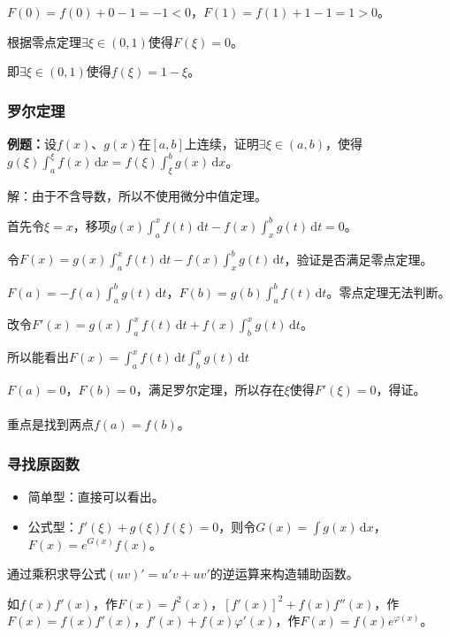 $F(0)=f(0)+0-1=-1<0$，$F(1)=f(1)+1-1=1>0$。

根据零点定理$\exists\xi\in(0,1)$使得$F(\xi)=0$。

即$\exists\xi\in(0,1)$使得$f(\xi)=1-\xi$。

\subsubsection{罗尔定理}

\textbf{例题：}设$f(x)$、$g(x)$在$[a,b]$上连续，证明$\exists\xi\in(a,b)$，使得$g(\xi)\int_a^\xi f(x)\,\textrm{d}x=f(\xi)\int_\xi^bg(x)\,\textrm{d}x$。

解：由于不含导数，所以不使用微分中值定理。

首先令$\xi=x$，移项$g(x)\int_a^xf(t)\,\textrm{d}t-f(x)\int_x^bg(t)\,\textrm{d}t=0$。

令$F(x)=g(x)\int_a^xf(t)\,\textrm{d}t-f(x)\int_x^bg(t)\,\textrm{d}t$，验证是否满足零点定理。

$F(a)=-f(a)\int_a^bg(t)\,\textrm{d}t$，$F(b)=g(b)\int_a^bf(t)\,\textrm{d}t$。零点定理无法判断。

改令$F'(x)=g(x)\int_a^xf(t)\,\textrm{d}t+f(x)\int_b^xg(t)\,\textrm{d}t$。

所以能看出$F(x)=\int_a^xf(t)\,\textrm{d}t\int_b^xg(t)\,\textrm{d}t$

$F(a)=0$，$F(b)=0$，满足罗尔定理，所以存在$\xi$使得$F'(\xi)=0$，得证。

\paragraph{}

重点是找到两点$f(a)=f(b)$。

\subsubsection{寻找原函数}


\begin{itemize}
    \item 简单型：直接可以看出。
    \item 公式型：$f'(\xi)+g(\xi)f(\xi)=0$，则令$G(x)=\int g(x)\,\textrm{d}x$，$F(x)=e^{G(x)}f(x)$。
\end{itemize}

通过乘积求导公式$(uv)'=u'v+uv'$的逆运算来构造辅助函数。

如$f(x)f'(x)$，作$F(x)=f^2(x)$，$[f'(x)]^2+f(x)f''(x)$，作$F(x)=f(x)f'(x)$，$f'(x)+f(x)\varphi'(x)$，作$F(x)=f(x)e^{\varphi(x)}$。

